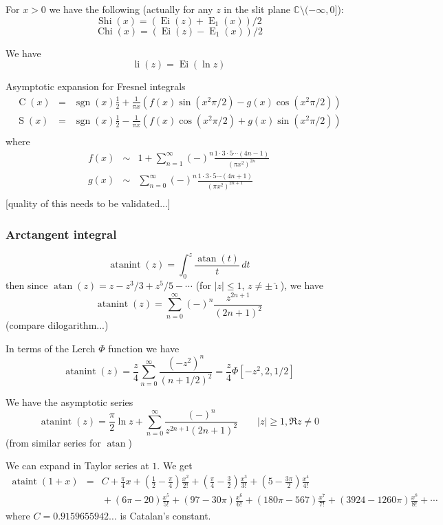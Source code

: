 \documentclass[10pt,dvipdfmx,letterpaper,twoside]{article}
\DeclareMathOperator{\atan}{atan}
\let\O=\operatorname
\newcommand{\CC}{{\mathbb{C}}}
\newcommand{\ii}{{\hat{\imath}}}
\begin{document}
For $x>0$ we have the following (actually for any $z$ in the slit plane $\CC\setminus(-\infty,0]$):
\[ \O{Shi}(x) = (\O{Ei}(z) + \O{E}_1(x))/2 \]
\[ \O{Chi}(x) = (\O{Ei}(z) - \O{E}_1(x))/2 \]

We have
\[ \O{li}(z) = \O{Ei}(\ln z) \]

Asymptotic expansion for Fresnel integrals
\begin{eqnarray*}
\O{C}(x) &=& \O{sgn}(x)\frac12 + \frac{1}{\pi x}\left( f(x)\sin(x^2\pi/2) - g(x)\cos(x^2\pi/2) \right) \\
\O{S}(x) &=& \O{sgn}(x)\frac12 - \frac{1}{\pi x}\left( f(x)\cos(x^2\pi/2) + g(x)\sin(x^2\pi/2) \right) \\
\end{eqnarray*}
where
\begin{eqnarray*}
f(x) &\sim& 1 + \sum_{n=1}^\infty (-)^n \frac{1\cdot3\cdot5\cdots(4n-1)}{(\pi x^2)^{2n  }} \\
g(x) &\sim&     \sum_{n=0}^\infty (-)^n \frac{1\cdot3\cdot5\cdots(4n+1)}{(\pi x^2)^{2n+1}} \\
\end{eqnarray*}
[quality of this needs to be validated...]

\subsubsection{Arctangent integral}

\[ \O{atanint}(z) = \int_0^z\frac{\atan(t)}{t}\,dt \]
then since $\atan(z)=z-z^3/3+z^5/5-\cdots$ (for $|z|\leq1$, $z\neq\pm\ii$), we have
\[ \O{atanint}(z) = \sum_{n=0}^\infty(-)^n\frac{z^{2n+1}}{(2n+1)^2} \]
(compare dilogarithm...)

In terms of the Lerch $\Phi$ function we have
\[ \O{atanint}(z) = \frac{z}{4}\sum_{n=0}^\infty\frac{(-z^2)^n}{(n+1/2)^2} = \frac{z}{4}\Phi[-z^2, 2, 1/2] \]

We have the asymptotic series
\[ \O{atanint}(z) = \frac\pi2\ln z + \sum_{n=0}^\infty \frac{(-)^n}{z^{2n+1}(2n+1)^2} \qquad|z|\geq1, \Re z\neq0\]
(from similar series for $\atan$)

We can expand in Taylor series at $1$.  We get
\begin{eqnarray*}
  \O{ataint}(1+x) &=& C + \frac\pi4 x + \left(\frac12-\frac\pi4\right) \frac{x^2}{2!} + \left(\frac\pi4-\frac32\right) \frac{x^3}{3!} + \left(5-\frac{3\pi}2\right) \frac{x^4}{4!} \\
      && {} + \left(6\pi-20\right) \frac{x^5}{5!} + \left(97-30\pi\right) \frac{x^6}{6!} + \left(180\pi-567\right) \frac{x^7}{7!} + \left(3924-1260\pi\right) \frac{x^8}{8!} + \cdots
\end{eqnarray*}
where $C=0.9159655942\dots$ is Catalan's constant.
\end{document}
